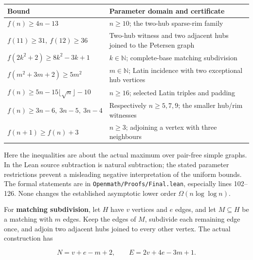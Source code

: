 \documentclass[
  11pt,
]{article}
\newcounter{none} %
\begin{document}
{\def\LTcaptype{none} %
\begin{longtable}[]{@{}
  >{\raggedright\arraybackslash}p{}
  >{\raggedright\arraybackslash}p{}@{}}
\toprule\noalign{}
\begin{minipage}[b]{\linewidth}\raggedright
Bound
\end{minipage} & \begin{minipage}[b]{\linewidth}\raggedright
Parameter domain and certificate
\end{minipage} \\
\midrule\noalign{}
\endhead
\bottomrule\noalign{}
\endlastfoot
\(f(n)\ge4n-13\) & \(n\ge10\); the two-hub sparse-rim family \\
\(f(11)\ge31,\ f(12)\ge36\) & Two-hub witness and two adjacent hubs
joined to the Petersen graph \\
\(f(2k^2+2)\ge8k^2-3k+1\) & \(k\in\mathbb{N}\); complete-base matching
subdivision \\
\(f(m^2+3m+2)\ge5m^2\) & \(m\in\mathbb{N}\); Latin incidence with two
exceptional hub vertices \\
\(f(n)\ge5n-15\lfloor\sqrt{n}\rfloor-10\) & \(n\ge16\); selected Latin
triples and padding \\
\(f(n)\ge3n-6,\ 3n-5,\ 3n-4\) & Respectively \(n\ge5,7,9\); the smaller
hub/rim witnesses \\
\(f(n+1)\ge f(n)+3\) & \(n\ge3\); adjoining a vertex with three
neighbours \\
\end{longtable}
}

Here the inequalities are about the actual maximum over pair-free simple
graphs. In the Lean source subtraction is natural subtraction; the
stated parameter restrictions prevent a misleading negative
interpretation of the uniform bounds. The formal statements are in
\texttt{Openmath/Proofs/Final.lean}, especially lines 102--126. None
changes the established asymptotic lower order \(\Omega(n\log\log n)\).

For \textbf{matching subdivision}, let \(H\) have \(v\) vertices and
\(e\) edges, and let \(M\subseteq H\) be a matching with \(m\) edges.
Keep the edges of \(M\), subdivide each remaining edge once, and adjoin
two adjacent hubs joined to every other vertex. The actual construction
has

\[N=v+e-m+2,\qquad E=2v+4e-3m+1.\]
\end{document}
